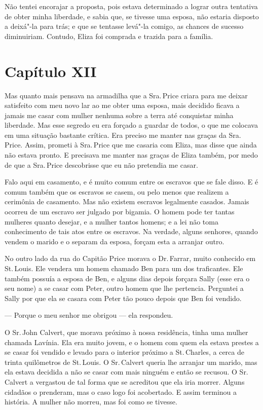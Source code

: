Não tentei encorajar a proposta, pois estava determinado a lograr outra
tentativa de obter minha liberdade, e sabia que, se tivesse uma esposa,
não estaria disposto a deixá"-la para trás; e que se tentasse levá"-la
comigo, as chances de sucesso diminuiriam. Contudo, Eliza foi comprada e
trazida para a família. \enlargethispage{\baselineskip}

\chapter*{Capítulo XII}

Mas quanto mais pensava na armadilha que a Sra.\,Price criara para me
deixar satisfeito com meu novo lar ao me obter uma esposa, mais decidido
ficava a jamais me casar com mulher nenhuma sobre a terra até conquistar
minha liberdade. Mas esse segredo eu era forçado a guardar de todos, o \label{ref3}
que me colocava em uma situação bastante crítica. Era preciso me manter
nas graças da Sra.\,Price. Assim, prometi à Sra.\,Price que me casaria com
Eliza, mas disse que ainda não estava pronto. E precisava me manter nas
graças de Eliza também, por medo de que a Sra.\,Price descobrisse que eu
não pretendia me casar.

Falo aqui em casamento, e é muito comum entre os escravos que se fale
disso. E é comum também que os escravos se casem, ou pelo menos que
realizem a cerimônia de casamento. Mas não existem escravos legalmente
casados. Jamais ocorreu de um escravo ser julgado por bigamia. O homem
pode ter tantas mulheres quanto desejar, e a mulher tantos homens; e a
lei não toma conhecimento de tais atos entre os escravos. Na verdade,
alguns senhores, quando vendem o marido e o separam da esposa, forçam
esta a arranjar outro.

No outro lado da rua do Capitão Price morava o Dr.\,Farrar, muito
conhecido em St.\,Louis. Ele vendera um homem chamado Ben para um dos
traficantes. Ele também possuía a esposa de Ben, e alguns dias depois
forçara Sally (esse era o seu nome) a se casar com Peter, outro homem
que lhe pertencia. Perguntei a Sally por que ela se casara com Peter tão
pouco depois que Ben foi vendido.

--- Porque o meu senhor me obrigou --- ela respondeu.

O Sr.\,John Calvert, que morava próximo à nossa residência, tinha uma
mulher chamada Lavínia. Ela era muito jovem, e o homem com quem ela
estava prestes a se casar foi vendido e levado para o interior próximo a
St.\,Charles, a cerca de trinta quilômetros de St.\,Louis. O Sr.\,Calvert
queria lhe arranjar um marido, mas ela estava decidida a não se casar
com mais ninguém e então se recusou. O Sr.\,Calvert a vergastou de tal
forma que se acreditou que ela iria morrer. Alguns cidadãos o prenderam,
mas o caso logo foi acobertado. E assim terminou a história. A mulher
não morreu, mas foi como se tivesse.

